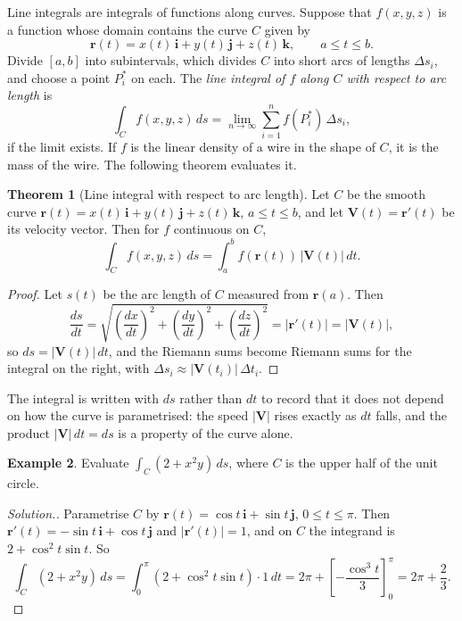 \documentclass[11pt,a4paper]{article}
\theoremstyle{definition}
\newtheorem{thm}{Theorem}[subsection]
\newtheorem{exa}[thm]{Example}
\newenvironment{solution}
  {\renewcommand{\qedsymbol}{}\begin{proof}[\textit{Solution}.]}
  {\end{proof}}
\begin{document}
Line integrals are integrals of functions along curves. Suppose that $f(x,y,z)$
is a function whose domain contains the curve $C$ given by
\[\mathbf r(t) = x(t)\,\mathbf i + y(t)\, \mathbf j + z(t)\,\mathbf k,\qquad
a\leq t\leq b .\]
Divide $[a,b]$ into subintervals, which divides $C$ into short arcs of lengths
$\Delta s_i$, and choose a point $P_i^*$ on each. The \emph{line integral of $f$
along $C$ with respect to arc length} is
\[\int_C f(x,y,z)\,ds = \lim_{n\to\infty}\sum_{i=1}^n f(P_i^*)\,\Delta s_i ,\]
if the limit exists. If $f$ is the linear density of a wire in the shape of $C$,
it is the mass of the wire. The following theorem evaluates it.

\begin{thm}[Line integral with respect to arc length]
\label{thm:arclength}
Let $C$ be the smooth curve
$\mathbf r(t) = x(t)\,\mathbf i + y(t)\,\mathbf j + z(t)\,\mathbf k$,
$a\leq t\leq b$, and let $\mathbf V(t) = \mathbf r'(t)$ be its velocity vector.
Then for $f$ continuous on $C$,
\[\int_C f(x,y,z)\,ds = \int^b_a f(\mathbf r(t))\,|\mathbf V(t)|\,dt .\]
\end{thm}

\begin{proof}
Let $s(t)$ be the arc length of $C$ measured from $\mathbf r(a)$. Then
\[\frac{ds}{dt} = \sqrt{\left(\frac{dx}{dt}\right)^2 + \left(\frac{dy}{dt}
\right)^2 + \left(\frac{dz}{dt}\right)^2} = |\mathbf r'(t)| = |\mathbf V(t)|,\]
so $ds = |\mathbf V(t)|\,dt$, and the Riemann sums become Riemann sums for the
integral on the right, with $\Delta s_i\approx |\mathbf V(t_i)|\,\Delta t_i$.
\end{proof}

The integral is written with $ds$ rather than $dt$ to record that it does not
depend on how the curve is parametrised: the speed $|\mathbf V|$ rises exactly as
$dt$ falls, and the product $|\mathbf V|\,dt = ds$ is a property of the curve
alone.

\begin{exa}
\label{ex:lineintcircle}
Evaluate $\int_C (2 +x^2y)\,ds$, where $C$ is the upper half of the unit circle.
\end{exa}

\begin{solution}
Parametrise $C$ by $\mathbf r(t) = \cos t\,\mathbf i + \sin t\,\mathbf j$,
$0\leq t \leq \pi$. Then $\mathbf r'(t) = -\sin t\,\mathbf i + \cos t\,\mathbf j$
and $|\mathbf r'(t)| = 1$, and on $C$ the integrand is
$2 + \cos^2t\sin t$. So
\[\int_C (2 + x^2y)\, ds = \int^{\pi}_0(2 + \cos^2t\sin t)\cdot 1 \,dt = 2\pi +
\left[-\frac{\cos^3 t}{3}\right]_0^\pi = 2\pi + \frac{2}{3} .\]
\end{solution}
\end{document}
